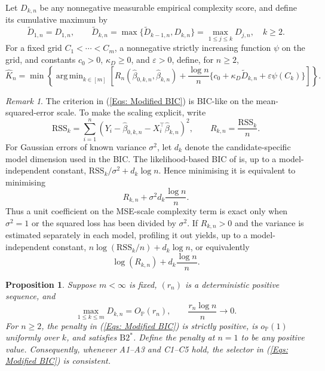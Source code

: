 \documentclass[12pt]{article}
\DeclareMathOperator*{\argmin}{arg\,min}
\newenvironment{bluechange}{\begingroup\color[rgb]{0.00,0.00,1.00}}{\endgroup}
\newtheorem{proposition}{Proposition}
\theoremstyle{remark}
\newtheorem{remark}{Remark}
\theoremstyle{plain}
\begin{document}
\begin{bluechange}
Let $D_{k,n}$ be any nonnegative measurable empirical complexity score, and define its cumulative maximum by
\begin{equation}\label{Eqs: cumulative complexity}
\widetilde D_{1,n}=D_{1,n},\qquad
\widetilde D_{k,n}=\max\{\widetilde D_{k-1,n},D_{k,n}\}
=\max_{1\le j\le k}D_{j,n},\quad k\ge2.
\end{equation}
For a fixed grid $C_1<\cdots<C_m$, a nonnegative strictly increasing function $\psi$ on the grid, and constants $c_0>0$, $\kappa_D\ge0$, and $\varepsilon>0$, define, for $n\ge2$,
\begin{equation}\label{Eqs: Modified BIC}
\widehat K_n=\min\left\{\argmin_{k\in[m]}\left[
R_n(\widehat\beta_{0,k,n},\widehat\beta_{k,n})
+\frac{\log n}{n}\{c_0+\kappa_D\widetilde D_{k,n}+\varepsilon\psi(C_k)\}
\right]\right\}.
\end{equation}

\begin{remark}
The criterion in (\ref{Eqs: Modified BIC}) is BIC-like on the mean-squared-error scale. To make the scaling explicit, write
\[
\mathrm{RSS}_k=\sum_{i=1}^n\left(Y_i-\widehat\beta_{0,k,n}-X_i^\top\widehat\beta_{k,n}\right)^2,
\qquad R_{k,n}=\frac{\mathrm{RSS}_k}{n}.
\]
For Gaussian errors of known variance $\sigma^2$, let $d_k$ denote the candidate-specific model dimension used in the BIC. The likelihood-based BIC of \citet{schwarz_estimating_1978} is, up to a model-independent constant, $\mathrm{RSS}_k/\sigma^2+d_k\log n$. Hence minimising it is equivalent to minimising
\begin{equation}\label{Eqs: known variance BIC}
R_{k,n}+\sigma^2d_k\frac{\log n}{n}.
\end{equation}
Thus a unit coefficient on the MSE-scale complexity term is exact only when $\sigma^2=1$ or the squared loss has been divided by $\sigma^2$. If $R_{k,n}>0$ and the variance is estimated separately in each model, profiling it out yields, up to a model-independent constant, $n\log(\mathrm{RSS}_k/n)+d_k\log n$, or equivalently
\begin{equation}\label{Eqs: profiled BIC}
\log(R_{k,n})+d_k\frac{\log n}{n}.
\end{equation}
\end{remark}

\begin{proposition}\label{Prop: generic BIC penalty}
Suppose $m<\infty$ is fixed, $(r_n)$ is a deterministic positive sequence, and
\[
\max_{1\le k\le m}D_{k,n}=O_{\mathbb P}(r_n),
\qquad \frac{r_n\log n}{n}\longrightarrow0.
\]
For $n\ge2$, the penalty in (\ref{Eqs: Modified BIC}) is strictly positive, is $o_{\mathbb P}(1)$ uniformly over $k$, and satisfies $\mathrm{B2}^*$. Define the penalty at $n=1$ to be any positive value. Consequently, whenever A1--A3 and C1--C5 hold, the selector in (\ref{Eqs: Modified BIC}) is consistent.
\end{proposition}


\end{bluechange}
\end{document}
